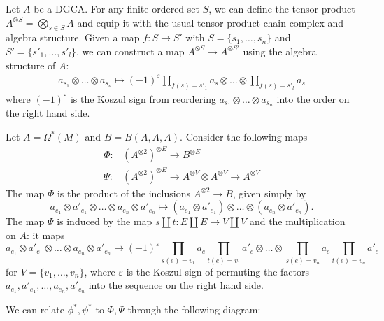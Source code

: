 \documentclass{scrartcl}
\theoremstyle{plain}
\theoremstyle{definition}
\renewcommand{\epsilon}{\varepsilon}
\DeclareMathOperator{\Map}{Map}
\renewcommand{\coprod}{\mathbin{\amalg}}
\newcommand{\Prod}{\prod}
\begin{document}
Let $A$ be a DGCA. For any finite ordered set $S$, we can define the tensor product $A^{\otimes S} = \bigotimes_{s\in S} A$ and equip it with the usual tensor product chain complex and algebra structure. Given a map $f\colon S\to S'$ with $S = \{s_1,\dots, s_n\}$ and $S' = \{s'_1,\dots, s'_l\}$, we can construct a map $A^{\otimes S}\to A^{\otimes S'}$ using the algebra structure of $A$:
\begin{align*}
    a_{s_1}\otimes\dots\otimes a_{s_n}\mapsto (-1)^\epsilon \Prod_{f(s) =s'_1} a_s \otimes\dots \otimes \Prod_{f(s) =s'_l} a_s
\end{align*}
where $(-1)^\epsilon$ is the Koszul sign from reordering $a_{s_1}\otimes\dots\otimes a_{s_n}$ into the order on the right hand side. 

Let $A=\Omega^*(M)$ and $B = B(A, A, A)$. Consider the following maps
\begin{align*}
    \Phi\colon& (A^{\otimes 2})^{\otimes E}\to B^{\otimes E} \\
    \Psi\colon& (A^{\otimes 2})^{\otimes E} \to A^{\otimes V}\otimes A^{\otimes V}\to A^{\otimes V} 
\end{align*}
The map $\Phi$ is the product of the inclusions $A^{\otimes 2}\to B$, given simply by
$$a_{e_1}\otimes a'_{e_1}\otimes\dots\otimes a_{e_n}\otimes a'_{e_n} \mapsto (a_{e_1}\otimes a'_{e_1}) \otimes \dots\otimes (a_{e_n}\otimes a'_{e_n}).$$ 
The map $\Psi$ is induced by the map $s\coprod t\colon E\coprod E\to V\coprod V$ and the multiplication on $A$: it maps 
$$a_{e_1}\otimes a'_{e_1}\otimes\dots\otimes a_{e_n}\otimes a'_{e_n} \mapsto (-1)^\epsilon \Prod_{s(e) = v_1}a_e \Prod_{t(e) = v_1} a'_e \otimes \dots\otimes \Prod_{s(e) = v_n}a_e \Prod_{t(e) = v_n} a'_e$$
for $V = \{v_1,\dots, v_n\}$, where $\epsilon$ is the Koszul sign of permuting the factors $a_{e_1}, a'_{e_1}, \dots, a_{e_n}, a'_{e_n}$ into the sequence on the right hand side. 

We can relate $\phi^*, \psi^*$ to $\Phi, \Psi$ through the following diagram: 
\begin{center}
\end{center}
\end{document}
